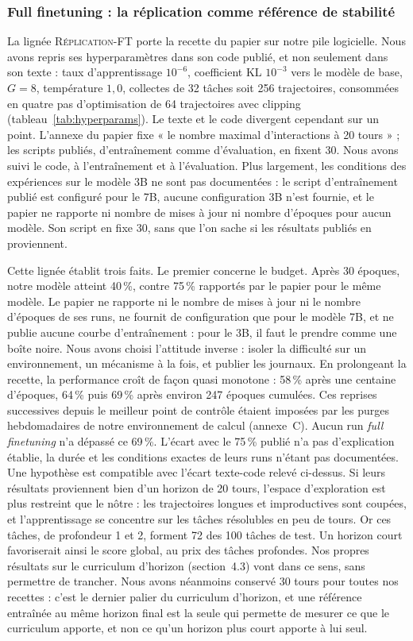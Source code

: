 \documentclass[11pt,a4paper]{article}
\begin{document}
\subsubsection{Full finetuning : la réplication comme référence de stabilité}

La lignée \textsc{Réplication-FT} porte la recette du papier sur notre pile logicielle. Nous avons repris ses hyperparamètres dans son code publié, et non seulement dans son texte : taux d'apprentissage $10^{-6}$, coefficient KL $10^{-3}$ vers le modèle de base, $G=8$, température $1{,}0$, collectes de 32 tâches soit 256 trajectoires, consommées en quatre pas d'optimisation de 64 trajectoires avec clipping (tableau~\ref{tab:hyperparams}). Le texte et le code divergent cependant sur un point. L'annexe du papier fixe « le nombre maximal d'interactions à 20 tours » ; les scripts publiés, d'entraînement comme d'évaluation, en fixent 30. Nous avons suivi le code, à l'entraînement et à l'évaluation. Plus largement, les conditions des expériences sur le modèle 3B ne sont pas documentées : le script d'entraînement publié est configuré pour le 7B, aucune configuration 3B n'est fournie, et le papier ne rapporte ni nombre de mises à jour ni nombre d'époques pour aucun modèle. Son script en fixe 30, sans que l'on sache si les résultats publiés en proviennent.

Cette lignée établit trois faits. Le premier concerne le budget. Après 30 époques, notre modèle atteint 40\,\%, contre 75\,\% rapportés par le papier pour le même modèle. Le papier ne rapporte ni le nombre de mises à jour ni le nombre d'époques de ses runs, ne fournit de configuration que pour le modèle 7B, et ne publie aucune courbe d'entraînement : pour le 3B, il faut le prendre comme une boîte noire. Nous avons choisi l'attitude inverse : isoler la difficulté sur un environnement, un mécanisme à la fois, et publier les journaux. En prolongeant la recette, la performance croît de façon quasi monotone : 58\,\% après une centaine d'époques, 64\,\% puis 69\,\% après environ 247 époques cumulées. Ces reprises successives depuis le meilleur point de contrôle étaient imposées par les purges hebdomadaires de notre environnement de calcul (annexe~C). Aucun run \emph{full finetuning} n'a dépassé ce 69\,\%. L'écart avec le 75\,\% publié n'a pas d'explication établie, la durée et les conditions exactes de leurs runs n'étant pas documentées. Une hypothèse est compatible avec l'écart texte-code relevé ci-dessus. Si leurs résultats proviennent bien d'un horizon de 20 tours, l'espace d'exploration est plus restreint que le nôtre : les trajectoires longues et improductives sont coupées, et l'apprentissage se concentre sur les tâches résolubles en peu de tours. Or ces tâches, de profondeur 1 et 2, forment 72 des 100 tâches de test. Un horizon court favoriserait ainsi le score global, au prix des tâches profondes. Nos propres résultats sur le curriculum d'horizon (section~4.3) vont dans ce sens, sans permettre de trancher. Nous avons néanmoins conservé 30 tours pour toutes nos recettes : c'est le dernier palier du curriculum d'horizon, et une référence entraînée au même horizon final est la seule qui permette de mesurer ce que le curriculum apporte, et non ce qu'un horizon plus court apporte à lui seul.
\end{document}
